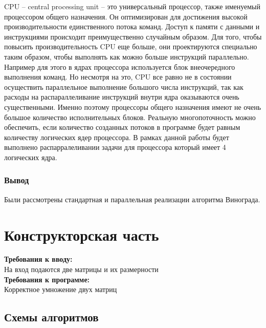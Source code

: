 \documentclass[12pt]{report}
\begin{document}
	CPU – central processing unit – это универсальный процессор, также именуемый процессором общего назначения. Он оптимизирован для достижения высокой производительности единственного потока команд. Доступ к памяти с данными и инструкциями происходит преимущественно случайным образом.
Для того, чтобы повысить производительность CPU еще больше, они проектируются специально таким образом, чтобы выполнять как можно больше инструкций параллельно. Например для этого в ядрах процессора используется блок внеочередного выполнения команд.	
Но несмотря на это, CPU все равно не в состоянии осуществить параллельное выполнение большого числа инструкций, так как расходы на распараллеливание инструкций внутри ядра оказываются очень существенными. Именно поэтому процессоры общего назначения имеют не очень большое количество исполнительных блоков.
Реальную многопоточность можно обеспечить, если количество созданных потоков в программе будет равным количеству логических ядер процессора.
В рамках данной работы будет выполнено распарралеливании задачи для процессора который имеет 4 логических ядра.


\subsection{Вывод}
Были рассмотрены стандартная и параллельная реализации алгоритма Винограда.


\chapter{Конструкторская часть}
\textbf{Требования к вводу:}\\
На вход подаются две матрицы и их размерности\\
\textbf{Требования к программе:}\\
Корректное умножение двух матриц \\


\section{Схемы алгоритмов}
\end{document}
